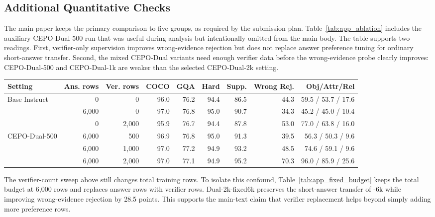 \subsection{Additional Quantitative Checks}

The main paper keeps the primary comparison to five groups, as required by the
submission plan. Table~\ref{tab:app_ablation} includes the auxiliary
CEPO-Dual-500 run that was useful during analysis but intentionally omitted
from the main body. The table supports two readings. First, verifier-only
supervision improves wrong-evidence rejection but does not replace answer
preference tuning for ordinary short-answer transfer. Second, the mixed
CEPO-Dual variants need enough verifier data before the wrong-evidence probe
clearly improves: CEPO-Dual-500 and CEPO-Dual-1k are weaker than the selected
CEPO-Dual-2k setting.

\begin{center}
\begin{minipage}{\linewidth}
\centering
\scriptsize
\setlength{\tabcolsep}{3.5pt}
\begin{tabular}{@{}lrrrrrrrr@{}}
\toprule
Setting & Ans. rows & Ver. rows & COCO & GQA & Hard & Supp. & Wrong Rej. & Obj/Attr/Rel \\
\midrule
Base Instruct & 0 & 0 & 96.0 & 76.2 & 94.4 & 86.5 & 44.3 & 59.5 / 53.7 / 17.6 \\
\answerdpo{} & 6{,}000 & 0 & 97.0 & 76.8 & 95.0 & 90.7 & 34.3 & 45.2 / 45.0 / 10.4 \\
\evidencedpo{} & 0 & 2{,}000 & 95.9 & 76.7 & 94.4 & 87.8 & 53.0 & 77.0 / 63.8 / 16.0 \\
CEPO-Dual-500 & 6{,}000 & 500 & 96.9 & 76.8 & 95.0 & 91.3 & 39.5 & 56.3 / 50.3 / 9.6 \\
\dualonek{} & 6{,}000 & 1{,}000 & 97.0 & 77.2 & 94.9 & 93.2 & 48.5 & 74.6 / 59.1 / 9.6 \\
\dualtwok{} & 6{,}000 & 2{,}000 & 97.0 & 77.1 & 94.9 & 95.2 & 70.3 & 96.0 / 85.9 / 25.6 \\
\bottomrule
\end{tabular}
\label{tab:app_ablation}
\end{minipage}
\end{center}

The verifier-count sweep above still changes total training rows. To isolate
this confound, Table~\ref{tab:app_fixed_budget} keeps the total budget at
6{,}000 rows and replaces answer rows with verifier rows. Dual-2k-fixed6k
preserves the short-answer transfer of \answerdpo{}-6k while improving
wrong-evidence rejection by 28.5 points. This supports the main-text claim
that verifier replacement helps beyond simply adding more preference rows.


